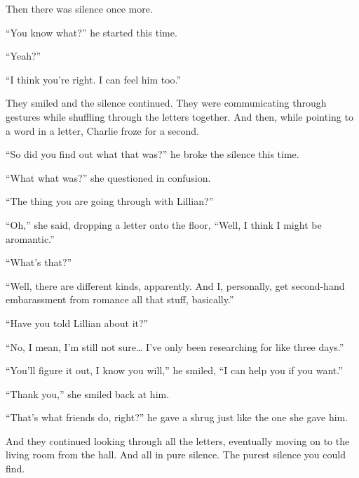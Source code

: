 Then there was silence once more.

“You know what?” he started this time.

“Yeah?”

“I think you’re right. I can feel him too.”

They smiled and the silence continued. They were communicating through gestures while shuffling through the letters together. And then, while pointing to a word in a letter, Charlie froze for a second.

“So did you find out what that was?” he broke the silence this time.

“What what was?” she questioned in confusion.

“The thing you are going through with Lillian?”

“Oh,” she said, dropping a letter onto the floor, “Well, I think I might be aromantic.”

“What’s that?”

“Well, there are different kinds, apparently. And I, personally, get second-hand embarassment from romance all that stuff, basically.”

“Have you told Lillian about it?”

“No, I mean, I’m still not sure… I’ve only been researching for like three days.”

“You’ll figure it out, I know you will,” he smiled, “I can help you if you want.”

“Thank you,” she smiled back at him.

“That’s what friends do, right?” he gave a shrug just like the one she gave him.

And they continued looking through all the letters, eventually moving on to the living room from the hall. And all in pure silence. The purest silence you could find.